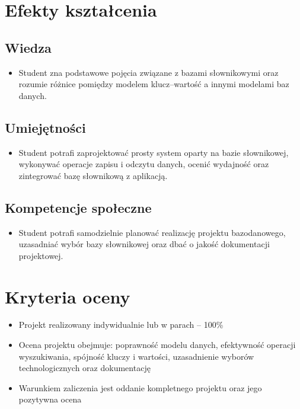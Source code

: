 \documentclass[12pt, a4paper]{article}
\begin{document}
\section{Efekty kształcenia}

\subsection*{Wiedza}
\begin{itemize}
  \item Student zna podstawowe pojęcia związane z bazami słownikowymi oraz rozumie różnice pomiędzy modelem klucz–wartość a innymi modelami baz danych.
\end{itemize}

\subsection*{Umiejętności}
\begin{itemize}
  \item Student potrafi zaprojektować prosty system oparty na bazie słownikowej, wykonywać operacje zapisu i odczytu danych, ocenić wydajność oraz zintegrować bazę słownikową z aplikacją.
\end{itemize}

\subsection*{Kompetencje społeczne}
\begin{itemize}
  \item Student potrafi samodzielnie planować realizację projektu bazodanowego, uzasadniać wybór bazy słownikowej oraz dbać o jakość dokumentacji projektowej.
\end{itemize}

\section{Kryteria oceny}

\begin{itemize}
  \item Projekt realizowany indywidualnie lub w parach – 100\%
  \item Ocena projektu obejmuje: poprawność modelu danych, efektywność operacji wyszukiwania, spójność kluczy i wartości, uzasadnienie wyborów technologicznych oraz dokumentację
  \item Warunkiem zaliczenia jest oddanie kompletnego projektu oraz jego pozytywna ocena
\end{itemize}
\end{document}
